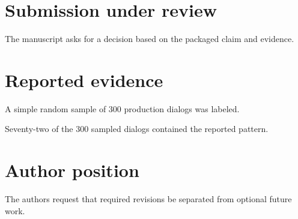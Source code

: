 \documentclass{article}
\begin{document}
\section{Submission under review}
The manuscript asks for a decision based on the packaged claim and evidence.
\section{Reported evidence}
A simple random sample of 300 production dialogs was labeled.

Seventy-two of the 300 sampled dialogs contained the reported pattern.
\section{Author position}
The authors request that required revisions be separated from optional future work.
\end{document}
